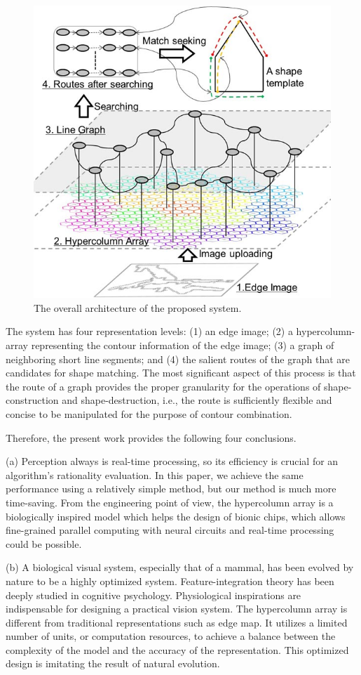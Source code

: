 \documentclass[journal]{IEEEtran}
\begin{document}
\begin{figure}[!t]
\centering
\includegraphics[width=0.6\linewidth]{images/fig24.jpg}
\caption{The overall architecture of the proposed system.}
\label{fig:24}
\end{figure}

The system has four representation levels: 
(1) an edge image; (2) a hypercolumn-array representing the contour information of the edge image; 
(3) a graph of neighboring short line segments; 
and (4) the salient routes of the graph that are candidates for shape matching. 
The most significant aspect of this process is that the route of a graph provides the proper granularity for the operations of shape-construction and shape-destruction, i.e., the route is sufficiently flexible and concise to be manipulated for the purpose of contour combination.

Therefore, the present work provides the following four conclusions.

(a) Perception always is real-time processing, so its efficiency is crucial for an algorithm's rationality evaluation. In this paper, we achieve the same performance using a relatively simple method, 
but our method is much more time-saving. 
From the engineering point of view,
the hypercolumn array is a biologically inspired model which helps the design of bionic chips, 
which allows fine-grained parallel computing with neural circuits and real-time processing could be possible.

(b) A biological visual system, especially that of a mammal, has been evolved by nature to be a highly optimized system.
Feature-integration theory has been deeply studied in cognitive psychology. 
Physiological inspirations are indispensable for designing a practical vision system.
The hypercolumn array is different from traditional representations such as edge map.
It utilizes a limited number of units, or computation resources, 
to achieve a balance between the complexity of the model and the accuracy of the representation. 
This optimized design is imitating the result of natural evolution.
\end{document}
